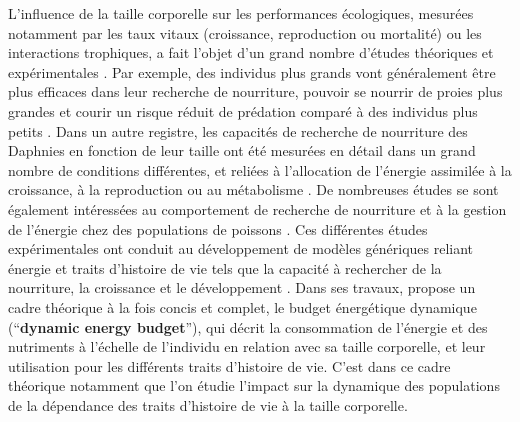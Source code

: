 L'influence de la taille corporelle sur les performances écologiques, mesurées
notamment par les taux vitaux (croissance, reproduction ou mortalité) ou les
interactions trophiques, a fait l'objet d'un grand nombre d'études théoriques
et expérimentales
\autocites{peters1986a,calder1996a,de-roos2001a,claessen2004a}. Par
exemple, des individus plus grands vont généralement être plus efficaces dans
leur recherche de nourriture, pouvoir se nourrir de proies plus grandes et
courir un risque réduit de prédation comparé à des individus plus petits
\autocites{paradis1996a}.
Dans un autre registre, les capacités de recherche de nourriture des Daphnies
en fonction de leur taille ont été mesurées en détail dans un grand nombre de
conditions différentes, et reliées à l'allocation de l'énergie assimilée à la
croissance, à la reproduction ou au métabolisme \autocites[par ex.
][]{lampert1978a,gurney1990a,mccauley1990a,kooijman2000a}. De nombreuses études
se sont également intéressées au comportement de recherche de nourriture et à la
gestion de l'énergie chez des populations de poissons \autocites[par ex.
][]{elliott1975a,mittelbach1981a,fuiman1994a,hjelm2001a}. Ces différentes études
expérimentales ont conduit au développement de modèles génériques reliant
énergie et traits d'histoire de vie tels que la capacité à rechercher de la
nourriture, la croissance et le développement
\autocites{kooijman2000a, nisbet2000a, west2001a}. Dans ses travaux,
\textcite{kooijman2000a} propose un cadre théorique à la fois concis et complet,
le budget énergétique dynamique (``\textbf{dynamic energy budget}''), qui décrit
la consommation  de l'énergie et des nutriments à l'échelle de l'individu en
relation avec sa taille corporelle, et leur utilisation pour les différents
traits d'histoire de vie. C'est dans ce cadre théorique notamment que l'on
étudie l'impact sur la dynamique des populations de la dépendance des traits
d'histoire de vie à la taille corporelle.

